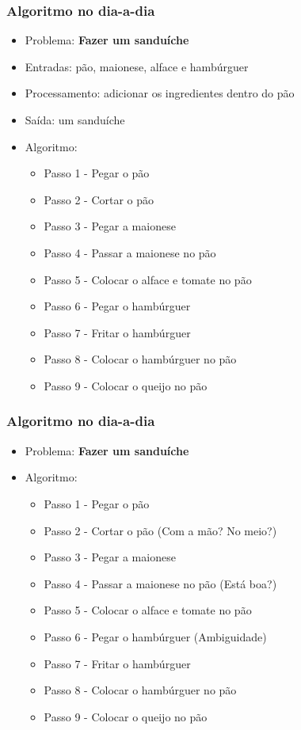\begin{frame}
	\frametitle{Algoritmo no dia-a-dia}
	\begin{itemize}
		\item Problema: \textbf{Fazer um sanduíche}
		\item Entradas: pão, maionese, alface e hambúrguer
		\item Processamento: adicionar os ingredientes dentro do pão
		\item Saída: um sanduíche
		\item Algoritmo:
		\begin{itemize}
			\item Passo 1 - Pegar o pão
			\item Passo 2 - Cortar o pão
			\item Passo 3 - Pegar a maionese
			\item Passo 4 - Passar a maionese no pão
			\item Passo 5 - Colocar o alface e tomate no pão
			\item Passo 6 - Pegar o hambúrguer
			\item Passo 7 - Fritar o hambúrguer
			\item Passo 8 - Colocar o hambúrguer no pão
			\item Passo 9 - Colocar o queijo no pão
		\end{itemize}
	\end{itemize}
\end{frame}



\begin{frame}
	\frametitle{Algoritmo no dia-a-dia}
	\begin{itemize}
		\item Problema: \textbf{Fazer um sanduíche}
		\item Algoritmo:
		\begin{itemize}
			\item<1-> Passo 1 - Pegar o pão
			\item<2-> Passo 2 - Cortar o pão \alert{(Com a mão? No meio?)}
			\item<3-> Passo 3 - Pegar a maionese
			\item<4-> Passo 4 - Passar a maionese no pão \alert{(Está boa?)}
			\item<5-> Passo 5 - Colocar o alface e tomate no pão
			\item<6-> Passo 6 - Pegar o hambúrguer \alert{(Ambiguidade)}
			\item<7-> Passo 7 - Fritar o hambúrguer
			\item<8-> Passo 8 - Colocar o hambúrguer no pão
			\item<9-> Passo 9 - Colocar o queijo no pão
		\end{itemize}
	\end{itemize}
\end{frame}


